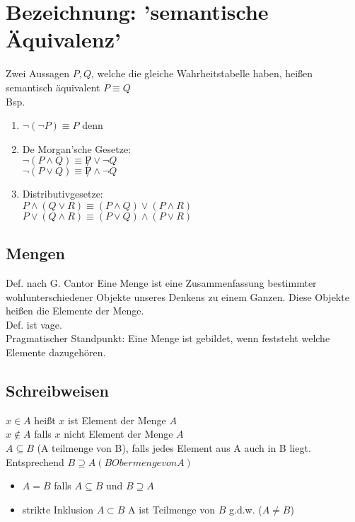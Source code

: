 \section{Bezeichnung: 'semantische Äquivalenz'}
Zwei Aussagen $P, Q$, welche die gleiche Wahrheitstabelle haben, heißen semantisch äquivalent $P \equiv Q$\\
Bsp.
\begin{enumerate}
\item $\neg(\neg P) \equiv P$ denn %
\item De Morgan'sche Gesetze:\\
$\neg (P \wedge Q) \equiv \not P \vee \neg Q$\\
$\neg (P \vee Q) \equiv \not P \wedge \neg Q$\\
\item Distributivgesetze:\\
$P \wedge (Q \vee R) \equiv (P \wedge Q) \vee (P \wedge R)$\\
$P \vee (Q \wedge R) \equiv (P \vee Q) \wedge (P \vee R)$\\
\end{enumerate}
\subsection*{Mengen}
Def. nach G. Cantor Eine Menge ist eine Zusammenfassung bestimmter wohlunterschiedener Objekte unseres Denkens zu einem Ganzen. Diese Objekte heißen die Elemente der Menge.\\
Def. ist vage.\\
Pragmatischer Standpunkt: Eine Menge ist gebildet, wenn feststeht welche Elemente dazugehören.\\
\subsection*{Schreibweisen}
$x \in A$ heißt $x$ ist Element der Menge $A$\\
$x \notin A$ falls $x$ nicht Element der Menge $A$\\
$A \subseteq B$ (A teilmenge von B), falls jedes Element aus A auch in B liegt.\\
Entsprechend $B \supseteq A (B Obermenge von A)$\\
\begin{itemize}
\item $A = B$ falls $A \subseteq B$ und $B \supseteq A$
\item strikte Inklusion $A \subset B$ A ist Teilmenge von $B$ g.d.w. ($A \neq B$)
\end{itemize}

